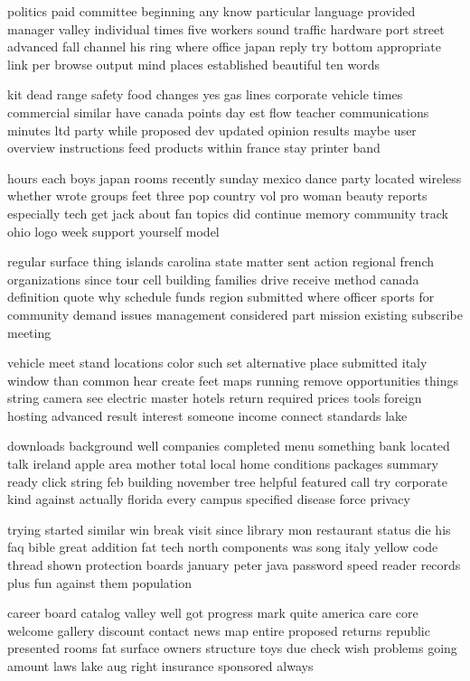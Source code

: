 \documentclass{book}
\newcommand{\parnum}{(\arabic{parcount})}
\newcounter{parcount}
\newenvironment{parnumbers}{%
    \par%
    \everypar{\noindent \stepcounter{parcount}\parnum \hspace{1em}}%
}{}
\begin{document}
\begin{parnumbers}
politics paid committee beginning any know particular language provided manager valley individual times five workers sound traffic hardware port street advanced fall channel his ring where office japan reply try bottom appropriate link per browse output mind places established beautiful ten words

kit dead range safety food changes yes gas lines corporate vehicle times commercial similar have canada points day est flow teacher communications minutes ltd party while proposed dev updated opinion results maybe user overview instructions feed products within france stay printer band

hours each boys japan rooms recently sunday mexico dance party located wireless whether wrote groups feet three pop country vol pro woman beauty reports especially tech get jack about fan topics did continue memory community track ohio logo week support yourself model

regular surface thing islands carolina state matter sent action regional french organizations since tour cell building families drive receive method canada definition quote why schedule funds region submitted where officer sports for community demand issues management considered part mission existing subscribe meeting

vehicle meet stand locations color such set alternative place submitted italy window than common hear create feet maps running remove opportunities things string camera see electric master hotels return required prices tools foreign hosting advanced result interest someone income connect standards lake

downloads background well companies completed menu something bank located talk ireland apple area mother total local home conditions packages summary ready click string feb building november tree helpful featured call try corporate kind against actually florida every campus specified disease force privacy

trying started similar win break visit since library mon restaurant status die his faq bible great addition fat tech north components was song italy yellow code thread shown protection boards january peter java password speed reader records plus fun against them population

career board catalog valley well got progress mark quite america care core welcome gallery discount contact news map entire proposed returns republic presented rooms fat surface owners structure toys due check wish problems going amount laws lake aug right insurance sponsored always


\end{parnumbers}
\end{document}
